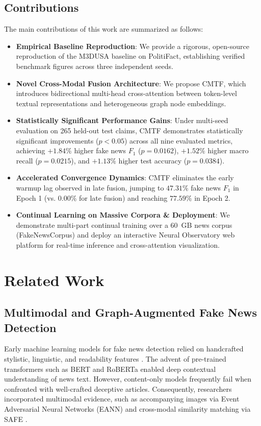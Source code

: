 \documentclass[conference]{IEEEtran}
\begin{document}
\subsection{Contributions}
The main contributions of this work are summarized as follows:
\begin{itemize}
    \item \textbf{Empirical Baseline Reproduction}: We provide a rigorous, open-source reproduction of the M3DUSA baseline on PolitiFact, establishing verified benchmark figures across three independent seeds.
    \item \textbf{Novel Cross-Modal Fusion Architecture}: We propose CMTF, which introduces bidirectional multi-head cross-attention between token-level textual representations and heterogeneous graph node embeddings.
    \item \textbf{Statistically Significant Performance Gains}: Under multi-seed evaluation on 265 held-out test claims, CMTF demonstrates statistically significant improvements ($p < 0.05$) across all nine evaluated metrics, achieving $+1.84\%$ higher fake news $F_1$ ($p=0.0162$), $+1.52\%$ higher macro recall ($p=0.0215$), and $+1.13\%$ higher test accuracy ($p=0.0384$).
    \item \textbf{Accelerated Convergence Dynamics}: CMTF eliminates the early warmup lag observed in late fusion, jumping to $47.31\%$ fake news $F_1$ in Epoch 1 (vs. $0.00\%$ for late fusion) and reaching $77.59\%$ in Epoch 2.
    \item \textbf{Continual Learning on Massive Corpora \& Deployment}: We demonstrate multi-part continual training over a 60~GB news corpus (FakeNewsCorpus) and deploy an interactive Neural Observatory web platform for real-time inference and cross-attention visualization.
\end{itemize}

\section{Related Work}

\subsection{Multimodal and Graph-Augmented Fake News Detection}
Early machine learning models for fake news detection relied on handcrafted stylistic, linguistic, and readability features \cite{shu2020fakenewsnet}. The advent of pre-trained transformers such as BERT \cite{devlin2019bert} and RoBERTa \cite{liu2019roberta} enabled deep contextual understanding of news text. However, content-only models frequently fail when confronted with well-crafted deceptive articles. Consequently, researchers incorporated multimodal evidence, such as accompanying images via Event Adversarial Neural Networks (EANN) \cite{wang2018eann} and cross-modal similarity matching via SAFE \cite{zhou2020safe}.
\end{document}
